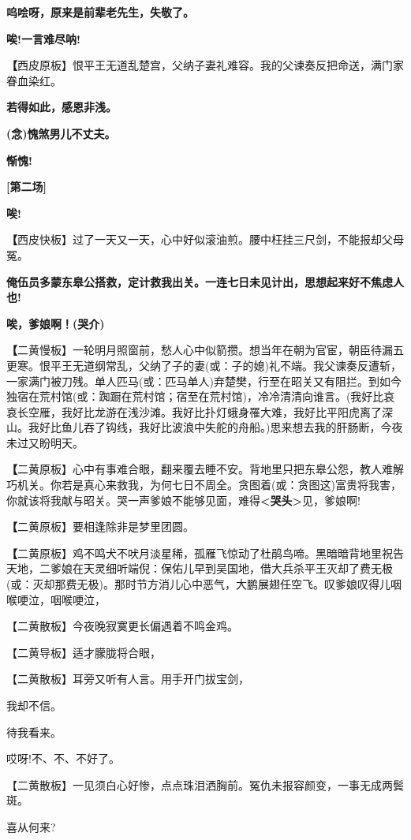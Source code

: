 \textbf{呜哙呀，原来是前辈老先生，失敬了。}

\textbf{唉!一言难尽呐!}

\textbf{【}西皮原板】恨平王无道乱楚宫，父纳子妻礼难容。我的父谏奏反把命送，满门家眷血染红。

\textbf{若得如此，感恩非浅。}

\textbf{(念)愧煞男儿不丈夫。}

\textbf{惭愧!}

\textbf{{[}第二场{]}}

\textbf{唉!}

\textbf{【}西皮快板】过了一天又一天，心中好似滚油煎。腰中枉挂三尺剑，不能报却父母冤。

\textbf{俺伍员多蒙东皋公搭救，定计救我出关。一连七日未见计出，思想起来好不焦虑人也!}

\textbf{唉，爹娘啊！(哭介)}

\textbf{【}二黄慢板】一轮明月照窗前，愁人心中似箭攒。想当年在朝为官宦，朝臣待漏五更寒。恨平王无道纲常乱，父纳了子的妻(或：子的媳)礼不端。我父谏奏反遭斩，一家满门被刀残。单人匹马(或：匹马单人)弃楚樊，行至在昭关又有阻拦。到如今独宿在荒村馆(或：踟蹰在荒村馆；宿至在荒村馆)，冷冷清清向谁言。(我好比哀哀长空雁，我好比龙游在浅沙滩。我好比扑灯蛾身罹大难，我好比平阳虎离了深山。我好比鱼儿吞了钩线，我好比波浪中失舵的舟船。)思来想去我的肝肠断，今夜未过又盼明天。

\textbf{【}二黄原板】心中有事难合眼，翻来覆去睡不安。背地里只把东皋公怨，教人难解巧机关。你若是真心来救我，为何七日不周全。贪图着(或：贪图这)富贵将我害，你就该将我献与昭关。哭一声爹娘不能够见面，难得\textbf{\textless{}哭头\textgreater{}}见，爹娘啊!

\textbf{【}二黄原板】要相逢除非是梦里团圆。

\textbf{【}二黄原板】鸡不鸣犬不吠月淡星稀，孤雁飞惊动了杜鹃鸟啼。黑暗暗背地里祝告天地，二爹娘在天灵细听端倪：保佑儿早到吴国地，借大兵杀平王灭却了费无极(或：灭却那费无极)。那时节方消儿心中恶气，大鹏展翅任空飞。叹爹娘叹得儿咽喉哽泣，咽喉哽泣，

【二黄散板】今夜晚寂寞更长偏遇着不鸣金鸡。

【二黄导板】适才朦胧将合眼，

【二黄散板】耳旁又听有人言。用手开门拔宝剑，

我却不信。

待我看来。

哎呀!不、不、不好了。

【二黄散板】一见须白心好惨，点点珠泪洒胸前。冤仇未报容颜变，一事无成两鬓斑。

喜从何来?

